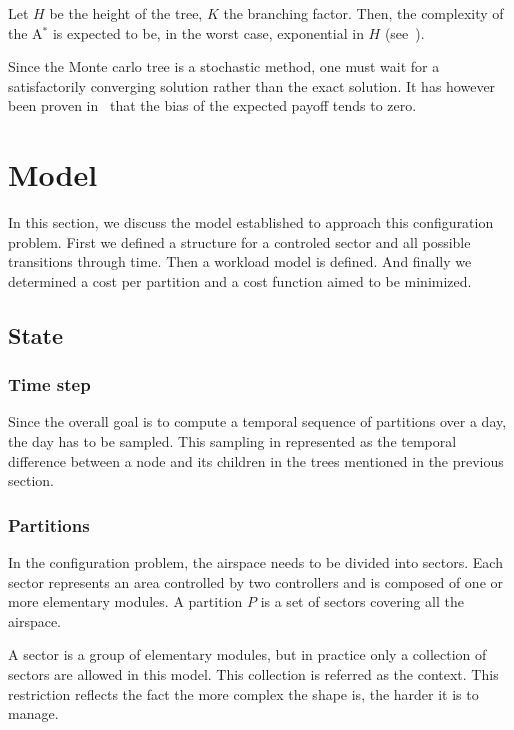 \documentclass[oneside,twocolumn]{article}
\begin{document}
Let \(H\) be the height of the tree, \(K\) the branching factor.
Then, the complexity of the A\(^*\) is expected to be, in the worst case,
exponential in \(H\) (see~\cite{alliotschiex2002ia&it}).

Since the Monte carlo tree is a stochastic method, one must wait for a
satisfactorily converging solution rather than the exact solution. It has
however been proven in~\cite{kocsis2006bandit} that the bias of the expected
payoff tends to zero.


\section{Model}

In this section, we discuss the model established to approach this configuration
problem. First we defined a structure for a controled sector and all possible
transitions through time. Then a workload model is defined. And finally we
determined a cost per partition and a cost function aimed to be minimized.

\subsection{State}

\subsubsection{Time step}
Since the overall goal is to compute a temporal sequence of partitions over a
day, the day has to be sampled. This sampling in represented as the temporal
difference between a node and its children in the trees mentioned in the
previous section.

\subsubsection{Partitions}\label{ssec:partitions}

In the configuration problem, the airspace needs to be divided into sectors. Each
sector represents an area controlled by two controllers and is composed of
one or more elementary modules. A partition $P$ is a set of
sectors covering all the airspace.

A sector is a group of elementary modules, but in practice only a collection
of sectors are allowed in this model. This collection is referred as the context.
This restriction reflects the fact the more complex the shape is, the harder it
is to manage.
\end{document}

